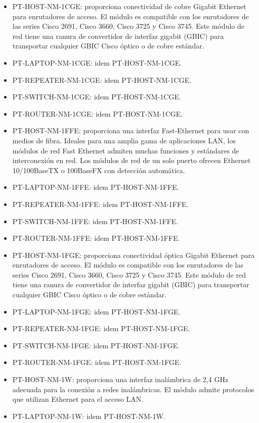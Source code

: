 \documentclass{article}
\begin{document}
\begin{itemize}
    \item PT-HOST-NM-1CGE: proporciona conectividad de cobre Gigabit Ethernet para enrutadores de acceso. El módulo es compatible con los enrutadores de las series Cisco 2691, Cisco 3660, Cisco 3725 y Cisco 3745. Este módulo de red tiene una ranura de convertidor de interfaz gigabit (GBIC) para transportar cualquier GBIC Cisco óptico o de cobre estándar.
    \item PT-LAPTOP-NM-1CGE: idem PT-HOST-NM-1CGE.
    \item PT-REPEATER-NM-1CGE: idem PT-HOST-NM-1CGE.
    \item PT-SWITCH-NM-1CGE: idem PT-HOST-NM-1CGE.
    \item PT-ROUTER-NM-1CGE: idem PT-HOST-NM-1CGE.
    
    \item PT-HOST-NM-1FFE: proporciona una interfaz Fast-Ethernet para usar con medios de fibra. Ideales para una amplia gama de aplicaciones LAN, los módulos de red Fast Ethernet admiten muchas funciones y estándares de interconexión en red. Los módulos de red de un solo puerto ofrecen Ethernet 10/100BaseTX o 100BaseFX con detección automática.
    \item PT-LAPTOP-NM-1FFE: idem PT-HOST-NM-1FFE.
    \item PT-REPEATER-NM-1FFE: idem PT-HOST-NM-1FFE.
    \item PT-SWITCH-NM-1FFE: idem PT-HOST-NM-1FFE.
    \item PT-ROUTER-NM-1FFE: idem PT-HOST-NM-1FFE.
    
    \item PT-HOST-NM-1FGE: proporciona conectividad óptica Gigabit Ethernet para enrutadores de acceso. El módulo es compatible con los enrutadores de las series Cisco 2691, Cisco 3660, Cisco 3725 y Cisco 3745. Este módulo de red tiene una ranura de convertidor de interfaz gigabit (GBIC) para transportar cualquier GBIC Cisco óptico o de cobre estándar.
    \item PT-LAPTOP-NM-1FGE: idem PT-HOST-NM-1FGE.
    \item PT-REPEATER-NM-1FGE: idem PT-HOST-NM-1FGE.
    \item PT-SWITCH-NM-1FGE: idem PT-HOST-NM-1FGE.
    \item PT-ROUTER-NM-1FGE: idem PT-HOST-NM-1FGE.
    
    \item PT-HOST-NM-1W: proporciona una interfaz inalámbrica de 2,4 GHz adecuada para la conexión a redes inalámbricas. El módulo admite protocolos que utilizan Ethernet para el acceso LAN.
    \item PT-LAPTOP-NM-1W: idem PT-HOST-NM-1W.
    

\end{itemize}
\end{document}
